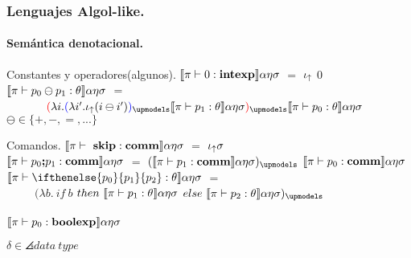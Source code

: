 \documentclass{beamer} %
\begin{document}
\begin{frame}[shrink=1]
\frametitle{Lenguajes Algol-like.}
\framesubtitle{Sem\'antica denotacional.}

\begin{block}{Constantes y operadores(algunos).}
$\llbracket \pi \vdash 0:\textbf{intexp} \rrbracket \alpha \eta \sigma$ $=$ $\iota_{\uparrow}$ $0$\\


$\llbracket \pi \vdash p_{0} \ominus p_{1} : \theta \rrbracket \alpha \eta \sigma$ $=$ \\
\ \ \ \ \ \ \ $\parentcolor{red}{\lambda i . \parentcolor{blue}{\lambda i' . \iotabot (i \ominus i')}_{\upmodels}
\denotalsem{\pi}{p_1:\theta}{\alpha}{\eta}{\sigma}}_{\upmodels}
\denotalsem{\pi}{p_0:\theta}{\alpha}{\eta}{\sigma}$\\

$\ominus \in \{+, -, =, ...\}$
\end{block}

\begin{block}{Comandos.}\small
$\denotalsem{\pi}{\ \cskip : \comm}{\alpha}{\eta}{\sigma}$ $=$ $\iota_{\uparrow} \sigma$\\
$\llbracket \pi \vdash  p_0 \textbf{;} p_1 : \textbf{comm} \rrbracket \alpha \eta \sigma$ $=$ 
$(\denotalsem{\pi}{p_1:\comm}{\alpha}{\eta}{\sigma})_{\upmodels}$ 
$\llbracket \pi \vdash p_0:\textbf{comm} \rrbracket \alpha \eta \sigma$\\
$\denotalsem{\pi}{\ifthenelse{p_0}{p_1}{p_2}:\theta}{\alpha}{\eta}{\sigma}$ $=$ \\
\ \ \ \ \ $(\lambda b . \ if \ b $
$then \ \denotalsem{\pi}{p_1:\theta}{\alpha}{\eta}{\sigma}$
$else \ \denotalsem{\pi}{p_2:\theta}{\alpha}{\eta}{\sigma})_{\upmodels}$ \\
\ \ \ \ \ \ \ \ \ \ \ \ \ \ \ \ \ \ \ \ \ \ \ \ \ \ \ \ \ \ \ \ \ \ \ \ \ \ \ \ \ \ \ \ \ \ \ \ \ \ \ \ \ \ \ \ 
$\llbracket \pi \vdash p_0:\textbf{boolexp} \rrbracket \alpha \eta \sigma$
\end{block}
$\delta \in \angles{data \ type}$
\end{frame}
\end{document}
